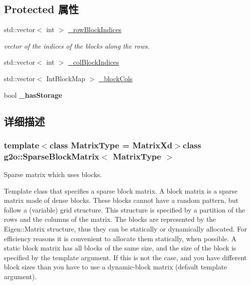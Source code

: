 \subsection*{Protected 属性}
\begin{DoxyCompactItemize}
\item 
\hypertarget{classg2o_1_1SparseBlockMatrix_ab0bd9c6d5b7b8704af1bc679032382e3}{std\-::vector$<$ int $>$ \hyperlink{classg2o_1_1SparseBlockMatrix_ab0bd9c6d5b7b8704af1bc679032382e3}{\-\_\-row\-Block\-Indices}}\label{classg2o_1_1SparseBlockMatrix_ab0bd9c6d5b7b8704af1bc679032382e3}

\begin{DoxyCompactList}\small\item\em vector of the indices of the blocks along the rows. \end{DoxyCompactList}\item 
std\-::vector$<$ int $>$ \hyperlink{classg2o_1_1SparseBlockMatrix_aca008740c37d2d00b90f696ab19abb59}{\-\_\-col\-Block\-Indices}
\item 
std\-::vector$<$ Int\-Block\-Map $>$ \hyperlink{classg2o_1_1SparseBlockMatrix_ae236d56a01ba4d292450a518621b41f8}{\-\_\-block\-Cols}
\item 
\hypertarget{classg2o_1_1SparseBlockMatrix_ae3f063a5efc2708b41806ac361fd3ca6}{bool {\bfseries \-\_\-has\-Storage}}\label{classg2o_1_1SparseBlockMatrix_ae3f063a5efc2708b41806ac361fd3ca6}

\end{DoxyCompactItemize}


\subsection{详细描述}
\subsubsection*{template$<$class Matrix\-Type = Matrix\-Xd$>$class g2o\-::\-Sparse\-Block\-Matrix$<$ Matrix\-Type $>$}

Sparse matrix which uses blocks. 

Template class that specifies a sparse block matrix. A block matrix is a sparse matrix made of dense blocks. These blocks cannot have a random pattern, but follow a (variable) grid structure. This structure is specified by a partition of the rows and the columns of the matrix. The blocks are represented by the Eigen\-::\-Matrix structure, thus they can be statically or dynamically allocated. For efficiency reasons it is convenient to allocate them statically, when possible. A static block matrix has all blocks of the same size, and the size of the block is specified by the template argument. If this is not the case, and you have different block sizes than you have to use a dynamic-\/block matrix (default template argument). 

